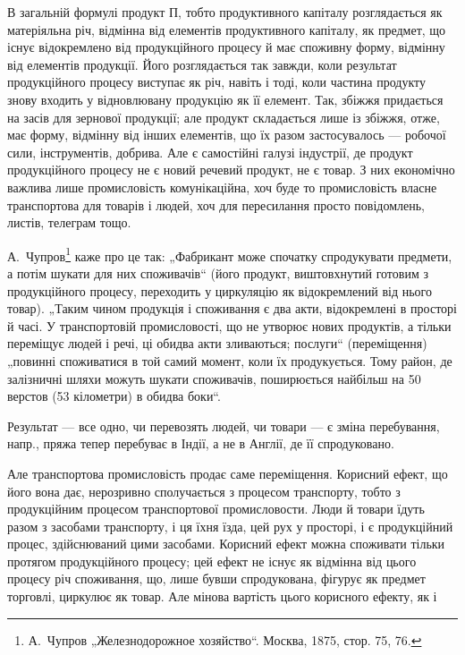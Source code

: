 В загальній формулі продукт $П$, тобто продуктивного капіталу розглядається
як матеріяльна річ, відмінна від елементів продуктивного капіталу, як
предмет, що існує відокремлено від продукційного процесу й має споживну
форму, відмінну від елементів продукції. Його розглядається так завжди, коли
результат продукційного процесу виступає як річ, навіть і тоді, коли частина
продукту знову входить у відновлювану продукцію як її елемент. Так,
збіжжя придається на засів для зернової продукції; але продукт складається
лише із збіжжя, отже, має форму, відмінну від інших елементів, що
їх разом застосувалось — робочої сили, інструментів, добрива. Але є
самостійні галузі індустрії, де продукт продукційного процесу не є
новий речевий продукт, не є товар. З них економічно важлива лише
промисловість комунікаційна, хоч буде то промисловість власне транспортова
для товарів і людей, хоч для пересилання просто повідомлень,
листів, телеграм тощо.

А.~Чупров\footnote{
А.~Чупров „Железнодорожное хозяйство“. Москва, 1875, стор. 75, 76.
} каже про це так: „Фабрикант може спочатку спродукувати
предмети, а потім шукати для них споживачів“ (його продукт, виштовхнутий
готовим з продукційного процесу, переходить у циркуляцію як
відокремлений від нього товар). „Таким чином продукція і споживання є
два акти, відокремлені в просторі й часі. У транспортовій промисловості,
що не утворює нових продуктів, а тільки переміщує людей і речі, ці
обидва акти зливаються; послуги“ (переміщення) „повинні споживатися в
той самий момент, коли їх продукується. Тому район, де залізничні шляхи
можуть шукати споживачів, поширюється найбільш на 50 верстов
(53 кілометри) в обидва боки“.

Результат — все одно, чи перевозять людей, чи товари — є зміна перебування,
напр., пряжа тепер перебуває в Індії, а не в Англії, де її спродуковано.

Але транспортова промисловість продає саме переміщення. Корисний
ефект, що його вона дає, нерозривно сполучається з процесом транспорту,
тобто з продукційним процесом транспортової промисловости.
Люди й товари їдуть разом з засобами транспорту, і ця їхня їзда, цей
рух у просторі, і є продукційний процес, здійснюваний цими засобами. Корисний
ефект можна споживати тільки протягом продукційного процесу;
цей ефект не існує як відмінна від цього процесу річ споживання,
що, лише бувши спродукована, фігурує як предмет торговлі,
циркулює як товар. Але мінова вартість цього корисного ефекту, як і
\parbreak{}  %
